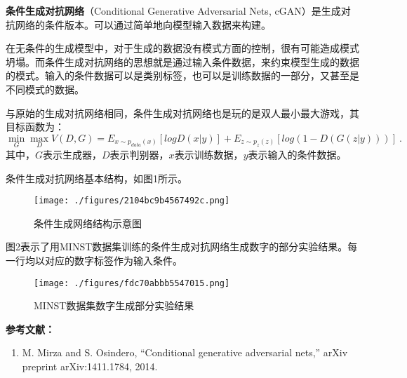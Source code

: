 

\textbf{条件生成对抗网络}（Conditional Generative Adversarial Nets, cGAN）是生成对抗网络的条件版本。可以通过简单地向模型输入数据来构建。

在无条件的生成模型中，对于生成的数据没有模式方面的控制，很有可能造成模式坍塌。而条件生成对抗网络的思想就是通过输入条件数据，来约束模型生成的数据的模式。输入的条件数据可以是类别标签，也可以是训练数据的一部分，又甚至是不同模式的数据。

与原始的生成对抗网络相同，条件生成对抗网络也是玩的是双人最小最大游戏，其目标函数为：
\begin{equation}
\mathop{\min}\limits_G \mathop {\max }\limits_D V(D,G)=E_{x\sim p_{data}(x)}[logD(x|y)]+E_{z\sim p_z(z)}[log(1-D(G(z|y)))]~.
\end{equation}
其中，$G$表示生成器，$D$表示判别器，$x$表示训练数据，$y$表示输入的条件数据。

条件生成对抗网络基本结构，如图1所示。
\begin{figure}[ht]
\centering
\texttt{[image: ./figures/2104bc9b4567492c.png]}
\caption{条件生成网络结构示意图} \label{fig_cGAN_1}
\end{figure}

图2表示了用MINST数据集训练的条件生成对抗网络生成数字的部分实验结果。每一行均以对应的数字标签作为输入条件。
\begin{figure}[ht]
\centering
\texttt{[image: ./figures/fdc70abbb5547015.png]}
\caption{MINST数据集数字生成部分实验结果} \label{fig_cGAN_2}
\end{figure}



\textbf{参考文献：}
\begin{enumerate}
\item M. Mirza and S. Osindero, “Conditional generative adversarial nets,” arXiv preprint arXiv:1411.1784, 2014.
\end{enumerate}